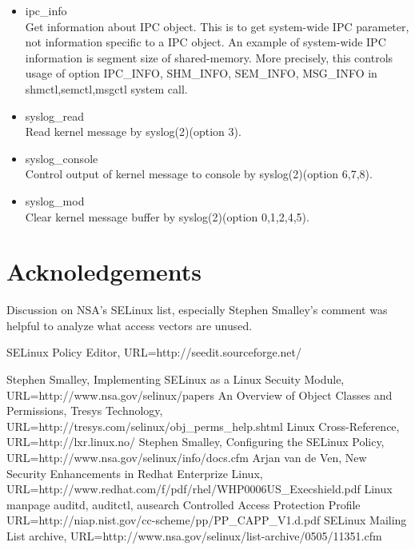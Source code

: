 \documentclass{article}
\begin{document}
\begin{itemize}
 \item  ipc\_info\\
	Get information about IPC object. This is to get system-wide
	IPC parameter, not information specific to a IPC object. An
	example of system-wide IPC information is segment size of
	shared-memory. More precisely, this controls usage of option
	IPC\_INFO, SHM\_INFO, SEM\_INFO, MSG\_INFO in
	shmctl,semctl,msgctl system call.
 \item 	syslog\_read\\	
	Read kernel message by
	syslog(2)(option 3). 
 \item syslog\_console \\
	Control output of kernel message to console by syslog(2)(option 6,7,8). 
 \item syslog\_mod \\
	Clear kernel message buffer by syslog(2)(option 0,1,2,4,5).
\end{itemize}

\section*{Acknoledgements}
Discussion on NSA's SELinux list, especially Stephen Smalley's
comment was helpful to analyze what access vectors are unused.


\begin{thebibliography}{99}
   SELinux Policy Editor,
	 URL=http://seedit.sourceforge.net/

 
 
  Stephen Smalley, Implementing SELinux
	 as a Linux Secuity Module,
	 URL=http://www.nsa.gov/selinux/papers
  An Overview of Object Classes and Permissions,
	 Tresys Technology,
	 URL=http://tresys.com/selinux/obj\_perms\_help.shtml
  Linux Cross-Reference, URL=http://lxr.linux.no/
  Stephen Smalley, Configuring the SELinux Policy,
	 URL=http://www.nsa.gov/selinux/info/docs.cfm
  Arjan van de Ven, New Security Enhancements in
	 Redhat Enterprize Linux,
	  URL=http://www.redhat.com/f/pdf/rhel/WHP0006US\_Execshield.pdf
  Linux manpage auditd, auditctl, ausearch 
  Controlled Access Protection Profile URL=http://niap.nist.gov/cc-scheme/pp/PP\_CAPP\_V1.d.pdf
  SELinux Mailing List archive,
	 URL=http://www.nsa.gov/selinux/list-archive/0505/11351.cfm

\end{thebibliography}
\end{document}
